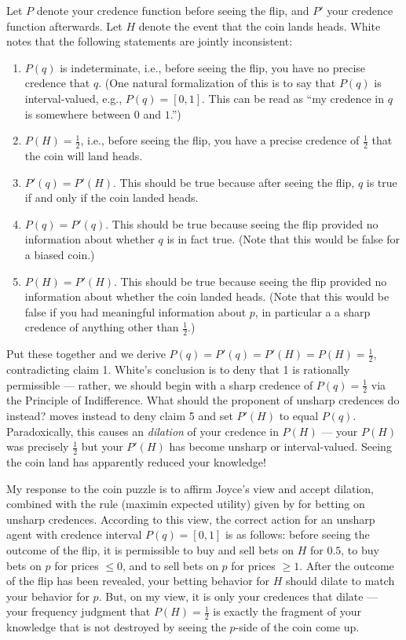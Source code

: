 \documentclass[letterpaper,12pt]{article}
\begin{document}
Let $P$ denote your credence function before seeing the flip, and $P'$ your credence function afterwards. Let $H$ denote the event that the coin lands heads. White notes that the following statements are jointly inconsistent:

\begin{enumerate}
\item
$P(q)$ is indeterminate, i.e., before seeing the flip, you have no precise credence that $q$. (One natural formalization of this is to say that $P(q)$ is interval-valued, e.g., $P(q) = [0, 1]$. This can be read as ``my credence in $q$ is somewhere between $0$ and $1$.'')
\item
$P(H) = \frac{1}{2}$, i.e., before seeing the flip, you have a precise credence of $\frac{1}{2}$ that the coin will land heads.
\item
$P'(q) = P'(H)$. This should be true because after seeing the flip, $q$ is true if and only if the coin landed heads.
\item
$P(q) = P'(q)$. This should be true because seeing the flip provided no information about whether $q$ is in fact true. (Note that this would be false for a biased coin.)
\item
$P(H) = P'(H)$. This should be true because seeing the flip provided no information about whether the coin landed heads. (Note that this would be false if you had meaningful information about $p$, in particular a a sharp credence of anything other than $\frac{1}{2}$.)
\end{enumerate}

Put these together and we derive $P(q) = P'(q) = P'(H) = P(H) = \frac{1}{2}$, contradicting claim 1. White's conclusion is to deny that 1 is rationally permissible --- rather, we should begin with a sharp credence of $P(q) = \frac{1}{2}$ via the Principle of Indifference. What should the proponent of unsharp credences do instead? \cite{Joyce2010-JOYADO-2} moves instead to deny claim 5 and set $P'(H)$ to equal $P(q)$. Paradoxically, this causes an \emph{dilation} of your credence in $P(H)$ --- your $P(H)$ was precisely $\frac{1}{2}$ but your $P'(H)$ has become unsharp or interval-valued. Seeing the coin land has apparently reduced your knowledge!

My response to the coin puzzle is to affirm Joyce's view and accept dilation, combined with the rule (maximin expected utility) given by \cite{Gardenfors1982-GRDUPR} for betting on unsharp credences. According to this view, the correct action for an unsharp agent with credence interval $P(q) = [0, 1]$ is as follows: before seeing the outcome of the flip, it is permissible to buy and sell bets on $H$ for $0.5$, to buy bets on $p$ for prices $\leq 0$, and to sell bets on $p$ for prices $\geq 1$. After the outcome of the flip has been revealed, your betting behavior for $H$ should dilate to match your behavior for $p$. But, on my view, it is only your credences that dilate --- your frequency judgment that $P(H) = \frac{1}{2}$ is exactly the fragment of your knowledge that is not destroyed by seeing the $p$-side of the coin come up.
\end{document}

